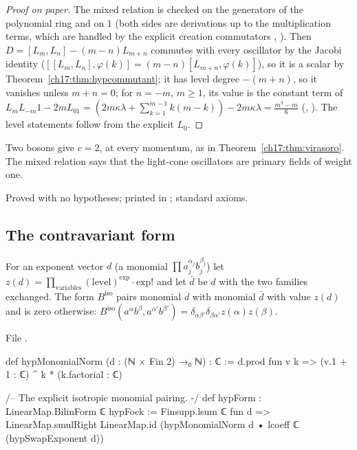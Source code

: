 \begin{proof}[Proof on paper]
The mixed relation is checked on the generators of the polynomial ring and
on $1$ (both sides are derivations up to the multiplication terms, which are handled by the explicit
creation commutators , ).  Then
$D=[L_m,L_n]-(m-n)L_{m+n}$ commutes with every oscillator by the Jacobi identity
($[[L_m,L_n],\varphi(k)]=(m-n)[L_{m+n},\varphi(k)]$), so it is a scalar by Theorem~\ref{ch17:thm:hypcommutant}; it has level
degree $-(m+n)$, so it vanishes unless $m+n=0$; for $n=-m$, $m\ge1$, its value is the constant term of
$L_mL_{-m}1-2mL_01=(2m\kappa\lambda+\sum_{k=1}^{m-1}k(m-k))-2m\kappa\lambda=\frac{m^3-m}6$
(, ).  The level statements follow from
the explicit $L_0$.
\end{proof}

\begin{physics}
Two bosons give $c=2$, at every momentum, as in Theorem~\ref{ch17:thm:virasoro}.  The mixed relation says
that the light-cone oscillators are primary fields of weight one.
\end{physics}

\begin{status}
Proved with no hypotheses; printed in ; standard axioms.
\end{status}

\subsection{The contravariant form}

\begin{definition}\label{ch17:def:hypform}
For an exponent vector $d$ (a monomial $\prod a_j^{\alpha_j}b_j^{\beta_j}$) let $z(d)=\prod_{\text{variables}}(\text{level})^{\text{exp}}\cdot\text{exp}!$
and let $\bar d$ be $d$ with the two families exchanged.  The form $B^{\mathrm{iso}}$ pairs monomial $d$ with
monomial $\bar d$ with value $z(d)$ and is zero otherwise: $B^{\mathrm{iso}}(a^\alpha b^\beta,a^{\alpha'}b^{\beta'})=\delta_{\alpha\beta'}\delta_{\beta\alpha'}z(\alpha)z(\beta)$.
\end{definition}

\noindent File .
\begin{leancode}
def hypMonomialNorm (d : (ℕ × Fin 2) →₀ ℕ) : ℂ :=
  d.prod fun v k => (v.1 + 1 : ℂ) ^ k * (k.factorial : ℂ)

/-- The explicit isotropic monomial pairing. -/
def hypForm : LinearMap.BilinForm ℂ hypFock :=
  Finsupp.lsum ℂ fun d =>
    LinearMap.smulRight LinearMap.id (hypMonomialNorm d • lcoeff ℂ (hypSwapExponent d))
\end{leancode}

